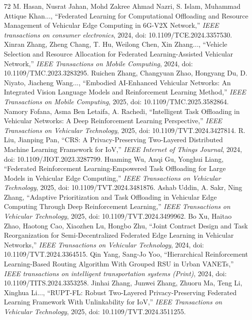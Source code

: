 \documentclass[journal]{IEEEtran}
\begin{document}
\begin{thebibliography}{72}
M. Hasan, Nusrat Jahan, Mohd Zakree Ahmad Nazri, S. Islam, Muhammad Attique Khan..., ``Federated Learning for Computational Offloading and Resource Management of Vehicular Edge Computing in 6G-V2X Network,'' \textit{IEEE transactions on consumer electronics}, 2024, doi: 10.1109/TCE.2024.3357530.
Xinran Zhang, Zheng Chang, T. Hu, Weilong Chen, Xin Zhang..., ``Vehicle Selection and Resource Allocation for Federated Learning-Assisted Vehicular Network,'' \textit{IEEE Transactions on Mobile Computing}, 2024, doi: 10.1109/TMC.2023.3283295.
Ruichen Zhang, Changyuan Zhao, Hongyang Du, D. Niyato, Jiacheng Wang..., ``Embodied AI-Enhanced Vehicular Networks: An Integrated Vision Language Models and Reinforcement Learning Method,'' \textit{IEEE Transactions on Mobile Computing}, 2025, doi: 10.1109/TMC.2025.3582864.
Namory Fofana, Asma Ben Letaifa, A. Rachedi, ``Intelligent Task Offloading in Vehicular Networks: A Deep Reinforcement Learning Perspective,'' \textit{IEEE Transactions on Vehicular Technology}, 2025, doi: 10.1109/TVT.2024.3427814.
R. Liu, Jianping Pan, ``CRS: A Privacy-Preserving Two-Layered Distributed Machine Learning Framework for IoV,'' \textit{IEEE Internet of Things Journal}, 2024, doi: 10.1109/JIOT.2023.3287799.
Huaming Wu, Anqi Gu, Yonghui Liang, ``Federated Reinforcement Learning-Empowered Task Offloading for Large Models in Vehicular Edge Computing,'' \textit{IEEE Transactions on Vehicular Technology}, 2025, doi: 10.1109/TVT.2024.3481876.
Ashab Uddin, A. Sakr, Ning Zhang, ``Adaptive Prioritization and Task Offloading in Vehicular Edge Computing Through Deep Reinforcement Learning,'' \textit{IEEE Transactions on Vehicular Technology}, 2025, doi: 10.1109/TVT.2024.3499962.
Bo Xu, Haitao Zhao, Haotong Cao, Xiaozhen Lu, Hongbo Zhu, ``Joint Contract Design and Task Reorganization for Semi-Decentralized Federated Edge Learning in Vehicular Networks,'' \textit{IEEE Transactions on Vehicular Technology}, 2024, doi: 10.1109/TVT.2024.3364515.
Qin Yang, Sang-Jo Yoo, ``Hierarchical Reinforcement Learning-Based Routing Algorithm With Grouped RSU in Urban VANETs,'' \textit{IEEE transactions on intelligent transportation systems (Print)}, 2024, doi: 10.1109/TITS.2024.3353258.
Jinhai Zhang, Junwei Zhang, Zhuoru Ma, Teng Li, Xinghua Li..., ``RUPT-FL: Robust Two-Layered Privacy-Preserving Federated Learning Framework With Unlinkability for IoV,'' \textit{IEEE Transactions on Vehicular Technology}, 2025, doi: 10.1109/TVT.2024.3511255.

\end{thebibliography}
\end{document}
